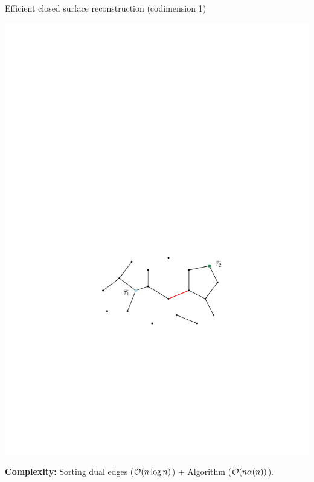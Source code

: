 \begin{frame}[c]{Efficient closed surface reconstruction (codimension 1)}
\begin{minipage}[c]{0.5\linewidth}
\begin{algorithm}[H]
		\end{algorithm}
	\end{minipage}%
	\begin{minipage}[c]{0.5\linewidth}
		\includegraphics[width=\linewidth]{dual/algo_step2}
	\end{minipage}
	
	\textbf{Complexity:} Sorting dual edges ($\mathcal{O}(n \log n)$) + Algorithm ($\mathcal{O}(n \alpha(n))$).
\end{frame}

